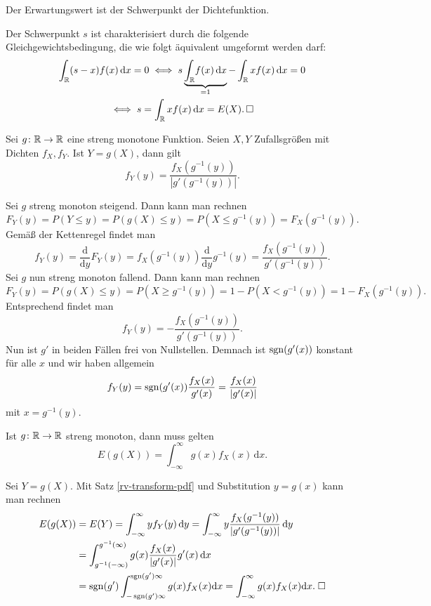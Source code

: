 \begin{Satz}
Der Erwartungswert ist der Schwerpunkt der Dichtefunktion.
\end{Satz}
\begin{Beweis} Der Schwerpunkt $s$ ist charakterisiert durch die
folgende Gleichgewichtsbedingung, die wie folgt äquivalent
umgeformt werden darf:
\begin{gather*}
\int_\mathbb R (s-x)f(x)\,\mathrm dx = 0
\iff s\underbrace{\int_\mathbb R\! f(x)\,\mathrm dx}_{=1}
- \int_\mathbb R xf(x)\,\mathrm dx = 0\\
\iff s = \int_\mathbb R xf(x)\,\mathrm dx = E(X).\,\square
\end{gather*}
\end{Beweis}

\begin{Satz}\label{rv-transform-pdf}
Sei $g\colon\mathbb R\to\mathbb R$ eine streng monotone Funktion. Seien
$X,Y$ Zufallsgrößen mit Dichten $f_X,f_Y$. Ist $Y=g(X)$,
dann gilt
\[f_Y(y) = \frac{f_X(g^{-1}(y))}{|g'(g^{-1}(y))|}.\]
\end{Satz}
 Sei $g$ streng monoton steigend. Dann kann man rechnen
\[F_Y(y) = P(Y\le y) = P(g(X)\le y) = P(X\le g^{-1}(y)) = F_X(g^{-1}(y)).\]
Gemäß der Kettenregel findet man
\[f_Y(y) = \frac{\mathrm d}{\mathrm dy}F_Y(y)
= f_X(g^{-1}(y))\frac{\mathrm d}{\mathrm dy}g^{-1}(y) = \frac{f_X(g^{-1}(y))}{g'(g^{-1}(y))}.\]
Sei $g$ nun streng monoton fallend. Dann kann man rechnen
\[F_Y(y) = P(g(X)\le y) = P(X\ge g^{-1}(y)) = 1 - P(X < g^{-1}(y))
= 1 - F_X(g^{-1}(y)).\]
Entsprechend findet man
\[f_Y(y) = -\frac{f_X(g^{-1}(y))}{g'(g^{-1}(y))}.\]
Nun ist $g'$ in beiden Fällen frei von Nullstellen. Demnach ist
$\operatorname{sgn}(g'(x))$ konstant für alle $x$ und wir haben allgemein
\[f_Y(y) = \operatorname{sgn}(g'(x))\frac{f_X(x)}{g'(x)} = \frac{f_X(x)}{|g'(x)|}\]
mit $x=g^{-1}(y)$.\;\qedsymbol

\begin{Satz}\newlinefirst
Ist $g\colon\mathbb R\to\mathbb R$ streng monoton, dann muss gelten
\[E(g(X)) = \int_{-\infty}^\infty g(x)f_X(x)\,\mathrm dx.\]
\end{Satz}
 Sei $Y=g(X)$. Mit Satz \ref{rv-transform-pdf}
und Substitution $y=g(x)$ kann man rechnen
\begin{align*}
E(g(X)) &= E(Y) = \int_{-\infty}^\infty yf_Y(y)\,\mathrm dy
= \int_{-\infty}^\infty y\frac{f_X(g^{-1}(y))}{|g'(g^{-1}(y))|}\,\mathrm dy\\
&= \int_{g^{-1}(-\infty)}^{g^{-1}(\infty)} g(x)
\frac{f_X(x)}{|g'(x)|}g'(x)\,\mathrm dx\\
&= \operatorname{sgn}(g')\int_{-\operatorname{sgn}(g')\infty}^{\operatorname{sgn}(g')\infty}g(x) f_X(x)\mathrm dx
= \int_{-\infty}^\infty g(x) f_X(x)\mathrm dx.\;\square
\end{align*}


